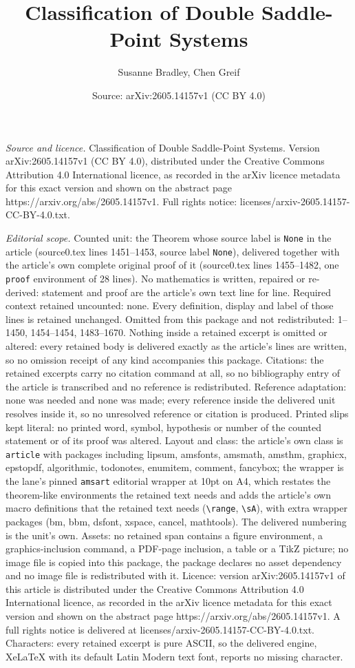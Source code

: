\documentclass[10pt,a4paper]{amsart}
\title[Classification of Double Saddle-Point Systems]{Classification of Double Saddle-Point Systems}
\author{Susanne Bradley, Chen Greif}
\date{Source: arXiv:2605.14157v1 (CC BY 4.0)}
\begin{document}
\maketitle

\noindent\emph{Source and licence.} Classification of Double Saddle-Point Systems. Version arXiv:2605.14157v1 (CC BY 4.0), distributed under the Creative Commons Attribution 4.0 International licence, as recorded in the arXiv licence metadata for this exact version and shown on the abstract page https://arxiv.org/abs/2605.14157v1. Full rights notice: licenses/arxiv-2605.14157-CC-BY-4.0.txt.\par\smallskip

\noindent\textit{Editorial scope.} Counted unit: the Theorem whose source label is \texttt{None} in the article (source0.tex lines 1451--1453, source label \texttt{None}), delivered together with the article's own complete original proof of it (source0.tex lines 1455--1482, one \texttt{proof} environment of 28 lines). No mathematics is written, repaired or re-derived: statement and proof are the article's own text line for line. Required context retained uncounted: none. Every definition, display and label of those lines is retained unchanged. Omitted from this package and not redistributed: 1--1450, 1454--1454, 1483--1670. Nothing inside a retained excerpt is omitted or altered: every retained body is delivered exactly as the article's lines are written, so no omission receipt of any kind accompanies this package. Citations: the retained excerpts carry no citation command at all, so no bibliography entry of the article is transcribed and no reference is redistributed. Reference adaptation: none was needed and none was made; every reference inside the delivered unit resolves inside it, so no unresolved reference or citation is produced. Printed slips kept literal: no printed word, symbol, hypothesis or number of the counted statement or of its proof was altered. Layout and class: the article's own class is \texttt{article} with packages including lipsum, amsfonts, amsmath, amsthm, graphicx, epstopdf, algorithmic, todonotes, enumitem, comment, fancybox; the wrapper is the lane's pinned \texttt{amsart} editorial wrapper at 10pt on A4, which restates the theorem-like environments the retained text needs and adds the article's own macro definitions that the retained text needs (\texttt{\textbackslash range}, \texttt{\textbackslash sA}), with extra wrapper packages (bm, bbm, dsfont, xspace, cancel, mathtools). The delivered numbering is the unit's own. Assets: no retained span contains a figure environment, a graphics-inclusion command, a PDF-page inclusion, a table or a TikZ picture; no image file is copied into this package, the package declares no asset dependency and no image file is redistributed with it. Licence: version arXiv:2605.14157v1 of this article is distributed under the Creative Commons Attribution 4.0 International licence, as recorded in the arXiv licence metadata for this exact version and shown on the abstract page https://arxiv.org/abs/2605.14157v1. A full rights notice is delivered at licenses/arxiv-2605.14157-CC-BY-4.0.txt. Characters: every retained excerpt is pure ASCII, so the delivered engine, XeLaTeX with its default Latin Modern text font, reports no missing character.
\end{document}
